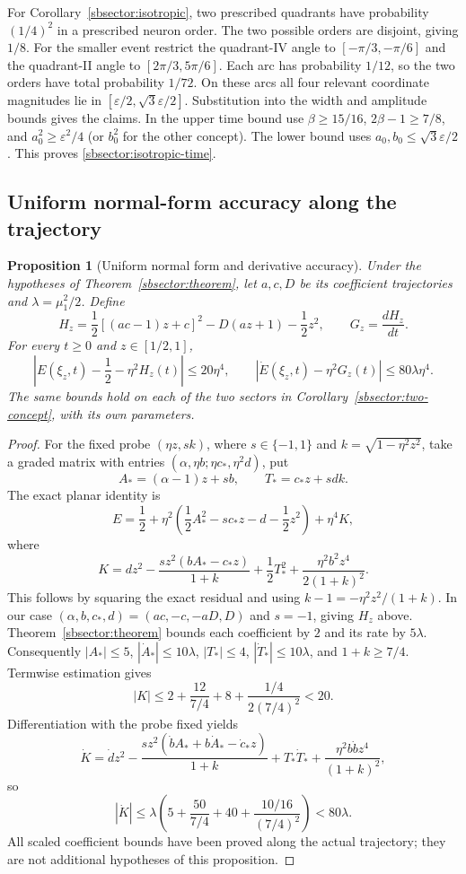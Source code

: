\documentclass[10pt]{article}
\newtheorem{proposition}[theorem]{Proposition}
\theoremstyle{remark}\newtheorem{remark}[theorem]{Remark}
\begin{document}
For Corollary~\ref{sbsector:isotropic}, two prescribed quadrants have
probability $(1/4)^2$ in a prescribed neuron order. The two possible
orders are disjoint, giving $1/8$. For the smaller event restrict the
quadrant-IV angle to $[-\pi/3,-\pi/6]$ and the quadrant-II angle to
$[2\pi/3,5\pi/6]$. Each arc has probability $1/12$, so the two orders
have total probability $1/72$. On these arcs all four relevant coordinate
magnitudes lie in $[\varepsilon/2,\sqrt3\varepsilon/2]$.
Substitution into the width and amplitude bounds gives the claims.
In the upper time bound use
$\beta\ge15/16$, $2\beta-1\ge7/8$, and
$a_0^2\ge\varepsilon^2/4$ (or $b_0^2$ for the other concept).
The lower bound uses $a_0,b_0\le\sqrt3\varepsilon/2$.
This proves \eqref{sbsector:isotropic-time}.


\subsection{Uniform normal-form accuracy along the trajectory}
\begin{proposition}[Uniform normal form and derivative accuracy]
\label{sbsector:profile}
Under the hypotheses of Theorem~\ref{sbsector:theorem}, let
$a,c,D$ be its coefficient trajectories and $\lambda=\mu_1^2/2$. Define
\[
 H_z=\frac12[(ac-1)z+c]^2-D(az+1)-\frac12z^2,
 \qquad G_z=\frac{dH_z}{dt}.
\]
For every $t\ge0$ and $z\in[1/2,1]$,
\[
 \left|E(\xi_z,t)-\frac12-\eta^2H_z(t)\right|\le20\eta^4,
 \qquad
 |\dot E(\xi_z,t)-\eta^2G_z(t)|\le80\lambda\eta^4.
\]
The same bounds hold on each of the two sectors in
Corollary~\ref{sbsector:two-concept}, with its own parameters.
\end{proposition}
\begin{proof}
For the fixed probe $(\eta z,sk)$, where $s\in\{-1,1\}$ and
$k=\sqrt{1-\eta^2z^2}$, take a graded matrix
with entries $(\alpha,\eta b;\eta c_*,\eta^2d)$, put
\[
 A_*=(\alpha-1)z+s b,\qquad T_*=c_*z+s d k.
\]
The exact planar identity is
\[
 E=\frac12+\eta^2\left(\frac12A_*^2-s c_*z-d-\frac12z^2\right)
                  +\eta^4K,
\]
where
\[
 K=dz^2-\frac{s z^2(bA_*-c_*z)}{1+k}
       +\frac12T_*^2+\frac{\eta^2b^2z^4}{2(1+k)^2}.
\]
This follows by squaring the exact residual and using
$k-1=-\eta^2z^2/(1+k)$. In our case
$(\alpha,b,c_*,d)=(ac,-c,-aD,D)$ and $s=-1$, giving $H_z$ above.
Theorem~\ref{sbsector:theorem} bounds each coefficient by $2$ and
its rate by $5\lambda$.
Consequently $|A_*|\le5$, $|\dot A_*|\le10\lambda$,
$|T_*|\le4$, $|\dot T_*|\le10\lambda$, and $1+k\ge7/4$.
Termwise estimation gives
\[
 |K|\le2+\frac{12}{7/4}+8+\frac{1/4}{2(7/4)^2}<20.
\]
Differentiation with the probe fixed yields
\[
 \dot K=\dot d z^2
 -\frac{s z^2(\dot b A_*+b\dot A_*-\dot c_*z)}{1+k}
 +T_*\dot T_*
 +\frac{\eta^2b\dot b z^4}{(1+k)^2},
\]
so
\[
 |\dot K|\le\lambda\left(5+\frac{50}{7/4}+40
                                  +\frac{10/16}{(7/4)^2}\right)<80\lambda.
\]
All scaled coefficient bounds have been proved along the actual
trajectory; they are not additional hypotheses of this proposition.
\end{proof}
\end{document}
